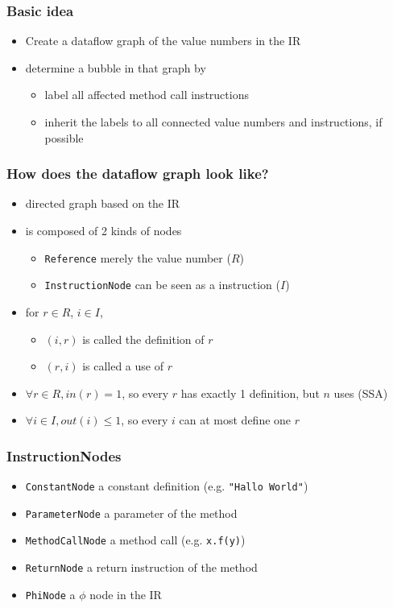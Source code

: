 \documentclass{beamer}
\begin{document}
\begin{frame}
  \frametitle{Basic idea}
  \begin{itemize}
      \item Create a dataflow graph of the value numbers in the IR
      \item determine a bubble in that graph by
      \begin{itemize}
        \item label all affected method call instructions
        \item inherit the labels to all connected value numbers and instructions, if possible
      \end{itemize}
  \end{itemize}
\end{frame}

\begin{frame}
  \frametitle{How does the dataflow graph look like?}
  \begin{itemize}
    \item directed graph based on the IR
    \item is composed of 2 kinds of nodes
      \begin{itemize}
        \item \texttt{Reference} merely the value number ($R$)
        \item \texttt{InstructionNode} can be seen as a instruction  ($I$)
      \end{itemize}
    \item for $r\in R$, $i \in I$, 
    \begin{itemize}
      \item $(i,r)$ is called the definition of $r$     
      \item $(r,i)$ is called a use of $r$
    \end{itemize}
    \item $\forall r \in R, in(r) = 1$, so every $r$ has exactly 1 definition, but $n$ uses (SSA)
    \item $\forall i \in I, out(i) \leq 1$, so every $i$ can at most define one $r$
  \end{itemize}
\end{frame}

\begin{frame}
  \frametitle{InstructionNodes}
  
  \begin{itemize}
    \item \texttt{ConstantNode} a constant definition (e.g. \texttt{"Hallo World"})
    \item \texttt{ParameterNode} a parameter of the method
    \item \texttt{MethodCallNode} a method call (e.g. \texttt{x.f(y)})
    \item \texttt{ReturnNode} a return instruction of the method
    \item \texttt{PhiNode} a $\phi$ node in the IR
  \end{itemize}

\end{frame}
\end{document}
